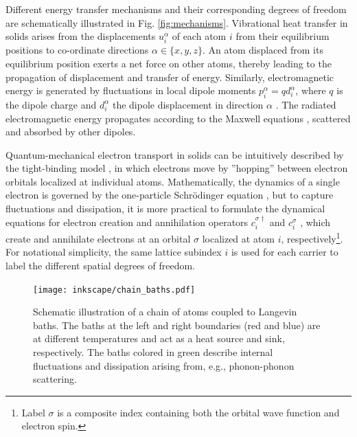 Different energy transfer mechanisms and their corresponding degrees of freedom are schematically illustrated in Fig. \ref{fig:mechanisms}. Vibrational heat transfer in solids arises from the displacements $u_i^{\alpha}$ of each atom $i$ from their equilibrium positions to co-ordinate directions $\alpha\in\{x,y,z\}$. An atom displaced from its equilibrium position exerts a net force on other atoms, thereby leading to the propagation of displacement and transfer of energy. Similarly, electromagnetic energy is generated by fluctuations in local dipole moments $p_i^{\alpha}=qd_i^{\alpha}$, where $q$ is the dipole charge and $d_i^{\alpha}$ the dipole displacement in direction $\alpha$ \cite{rosa10}. The radiated electromagnetic energy propagates according to the Maxwell equations \cite{novotny}, scattered and absorbed by other dipoles. 

Quantum-mechanical electron transport in solids can be intuitively described by the tight-binding model \cite{ashcroftmermin}, in which electrons move by ''hopping'' between electron orbitals localized at individual atoms. Mathematically, the dynamics of a single electron is governed by the one-particle Schr\"odinger equation \cite{griffiths_qm}, but to capture fluctuations and dissipation, it is more practical to formulate the dynamical equations for electron creation and annihilation operators $c_i^{\sigma\dagger}$ and $c_i^{\sigma}$ \cite{ballentine}, which create and annihilate electrons at an orbital $\sigma$ localized at atom $i$, respectively\footnote{Label $\sigma$ is a composite index containing both the orbital wave function and electron spin.}. For notational simplicity, the same lattice subindex $i$ is used for each carrier to label the different spatial degrees of freedom. 

\begin{figure}
 \begin{center}
 \texttt{[image: inkscape/chain\_baths.pdf]}
 \caption{Schematic illustration of a chain of atoms coupled to Langevin baths. The baths at the left and right boundaries (red and blue) are at different temperatures and act as a heat source and sink, respectively. The baths colored in green describe internal fluctuations and dissipation arising from, e.g., phonon-phonon scattering.}
 \label{fig:langevin_chain}
  \end{center}
\end{figure}

